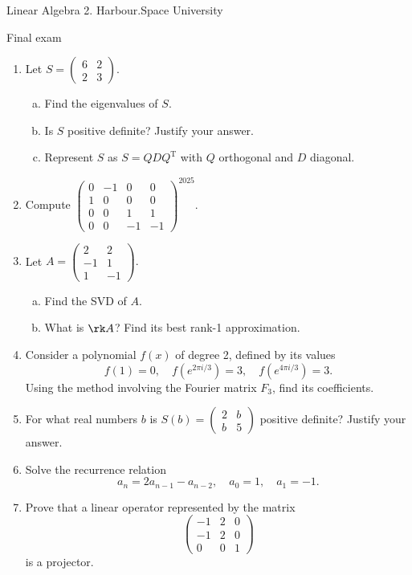 
\newpage
\begin{center}
Linear Algebra 2. Harbour.Space University

Final exam
\end{center}

\begin{enumerate}

\item Let
$
S=\begin{pmatrix}
6 & 2\\
2 & 3
\end{pmatrix}.
$
\begin{enumerate}[a)]
\item Find the eigenvalues of $S$.
\item Is $S$ positive definite? Justify your answer.
\item Represent $S$ as $S=Q D Q^{\mathrm T}$ with $Q$ orthogonal and $D$ diagonal.
\end{enumerate}

\item Compute
$
\begin{pmatrix}
0 & -1 & 0 & 0\\
1 & 0 & 0 & 0\\
0 & 0 & 1 & 1\\
0 & 0 & -1 & -1
\end{pmatrix}^{2025}.
$

\item Let
$
A=\begin{pmatrix}
2 & 2\\
-1 & 1\\
1 & -1
\end{pmatrix}.
$
\begin{enumerate}[a)]
\item Find the SVD of $A$.
\item What is $\rk A$? Find its best rank-1 approximation.
\end{enumerate}

\item Consider a polynomial $f(x)$ of degree 2, defined by its values
$$
f(1) = 0, \quad f(e^{2\pi i/3}) = 3, \quad f(e^{4\pi i/3}) = 3.
$$
Using the method involving the Fourier matrix $F_3$, find its coefficients.

\item For what real numbers $b$ is
$
S(b)=\begin{pmatrix}
2 & b\\
b & 5
\end{pmatrix}
$
positive definite? Justify your answer.

\item Solve the recurrence relation
$$
a_n = 2a_{n-1} - a_{n-2}, \quad a_0 = 1, \quad a_1 = -1.
$$

\item Prove that a linear operator represented by the matrix
$$
\begin{pmatrix}
-1 & 2 & 0\\
-1 & 2 & 0\\
0 & 0 & 1
\end{pmatrix}
$$
is a projector.

\end{enumerate}